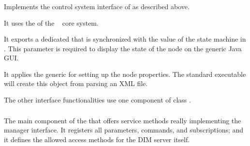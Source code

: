 \subsubsection{}
\label{prog_manager_controls_DIM_observer}
Implements the control system interface of  as described above. 

\begin{compactenum}

\item It uses the  of the \dabc~ core system.

\item It exports a dedicated  that is
synchronized with the value of the state machine in . 
This parameter is required to display the state of the node on the generic
Java GUI.

\item It applies the generic   for setting up
the node properties. The standard executable   will create 
this object from parsing an XML file. 

\item The other interface functionalities use one
component of class .

\end{compactenum}




\subsubsection{}
\label{prog_manager_controls_DIM_registry}
The main component of the  that
offers service methods really implementing the manager interface.
It registers all parameters, commands, and subscriptions; 
and it defines the allowed access methods for the DIM server itself.
 

